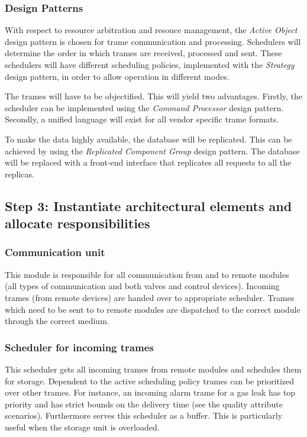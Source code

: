 \subsubsection{Design Patterns}
\label{add:it1/patterns} %

\npar With respect to resource arbitration and resouce management, the
\emph{Active Object} design pattern is chosen for trame communication and
processing. Schedulers will determine the order in which trames are received,
processed and sent. These schedulers will have different scheduling policies,
implemented with the \emph{Strategy} design pattern, in order to allow operation
in different modes.

\npar The trames will have to be objectified. This will yield two advantages.
Firstly, the scheduler can be implemented using the \emph{Command Processor}
design pattern. Secondly, a unified language will exist for all vendor
specific trame formats.

\npar To make the data highly available, the database will be replicated. This
can be achieved by using the \emph{Replicated Component Group} design pattern.
The database will be replaced with a front-end interface that replicates all
requests to all the replicas. 

\subsection{Step 3: Instantiate architectural elements and allocate responsibilities}
\label{add:it1/elements}


\subsubsection{Communication unit}

\npar This module is responsible for all communication from and to remote
modules (all types of communication and both valves and control devices).
Incoming trames (from remote devices) are handed over to appropriate scheduler.
Trames which need to be sent to to remote modules are dispatched to the correct
module through the correct medium.

\subsubsection{Scheduler for incoming trames}

\npar This scheduler gets all incoming trames from remote modules and schedules
them for storage. Dependent to the active scheduling policy trames can be
prioritized over other trames. For instance, an incoming alarm trame for a gas
leak has top priority and has strict bounds on the delivery time (see the
quality attribute scenarios). Furthermore serves this scheduler as a buffer.
This is particularly useful when the storage unit is overloaded.

